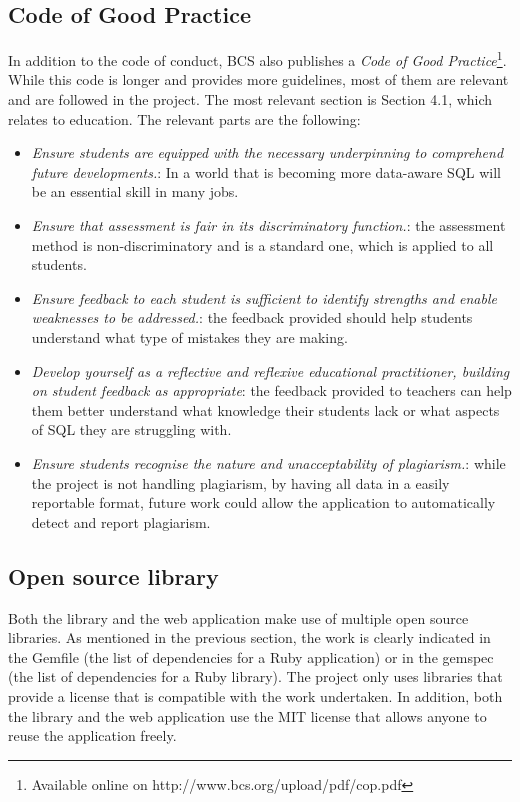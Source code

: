 \subsection{Code of Good Practice}

In addition to the code of conduct, BCS also publishes a \textit{Code of Good Practice}\footnote{Available online on http://www.bcs.org/upload/pdf/cop.pdf}. While this code is longer and provides more guidelines, most of them are relevant and are followed in the project. The most relevant section is Section 4.1, which relates to education. The relevant parts are the following:

\begin{itemize}
    \item \textit{Ensure students are equipped with the necessary underpinning to comprehend future developments.}: In a world that is becoming more data-aware SQL will be an essential skill in many jobs.
    \item \textit{Ensure that assessment is fair in its discriminatory function.}: the assessment method is non-discriminatory and is a standard one, which is applied to all students.
    \item \textit{Ensure feedback to each student is sufficient to identify strengths and enable weaknesses to be addressed.}: the feedback provided should help students understand what type of mistakes they are making.
    \item \textit{Develop yourself as a reflective and reflexive educational practitioner, building on student feedback as appropriate}: the feedback provided to teachers can help them better understand what knowledge their students lack or what aspects of SQL they are struggling with.
    \item \textit{Ensure students recognise the nature and unacceptability of plagiarism.}: while the project is not handling plagiarism, by having all data in a easily reportable format, future work could allow the application to automatically detect and report plagiarism.
\end{itemize}

\subsection{Open source library}

Both the library and the web application make use of multiple open source libraries. As mentioned in the previous section, the work is clearly indicated in the Gemfile (the list of dependencies for a Ruby application) or in the gemspec (the list of dependencies for a Ruby library). The project only uses libraries that provide a license that is compatible with the work undertaken. In addition, both the library and the web application use the MIT license that allows anyone to reuse the application freely.
